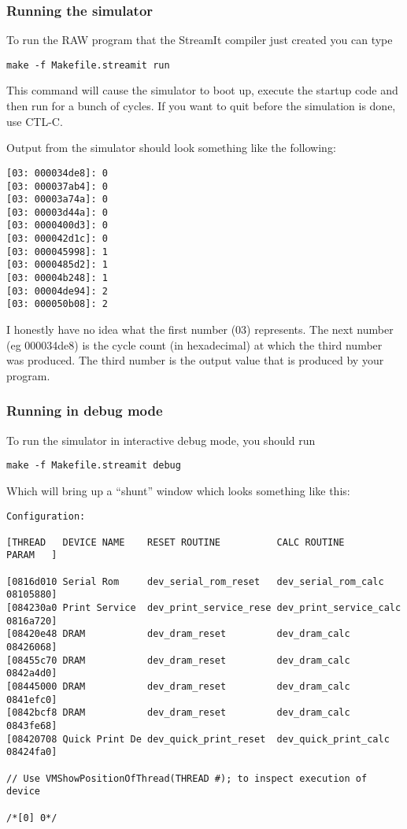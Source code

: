 \subsubsection{Running the simulator}
To run the RAW program that the StreamIt compiler just created
you can type 

\begin{verbatim}make -f Makefile.streamit run\end{verbatim}

This command will cause the simulator to boot up, execute the startup code
and then run for a bunch of cycles. If you want to quit before the 
simulation is done, use CTL-C. 

Output from the simulator should look something like the following:
\begin{verbatim}
[03: 000034de8]: 0
[03: 000037ab4]: 0
[03: 00003a74a]: 0
[03: 00003d44a]: 0
[03: 0000400d3]: 0
[03: 000042d1c]: 0
[03: 000045998]: 1
[03: 0000485d2]: 1
[03: 00004b248]: 1
[03: 00004de94]: 2
[03: 000050b08]: 2
\end{verbatim}

I honestly have no idea what the first number (03) represents. The next number 
(eg 000034de8) is the cycle count (in hexadecimal) at which the third number was produced. The 
third number is the output value that is produced by your program.

\subsubsection{Running in debug mode}
To run the simulator in interactive debug mode, you should run
\begin{verbatim}make -f Makefile.streamit debug\end{verbatim}

Which will bring up a ``shunt'' window which looks something like this:

\begin{verbatim}
Configuration: 

[THREAD   DEVICE NAME    RESET ROUTINE          CALC ROUTINE           PARAM   ]

[0816d010 Serial Rom     dev_serial_rom_reset   dev_serial_rom_calc    08105880]
[084230a0 Print Service  dev_print_service_rese dev_print_service_calc 0816a720]
[08420e48 DRAM           dev_dram_reset         dev_dram_calc          08426068]
[08455c70 DRAM           dev_dram_reset         dev_dram_calc          0842a4d0]
[08445000 DRAM           dev_dram_reset         dev_dram_calc          0841efc0]
[0842bcf8 DRAM           dev_dram_reset         dev_dram_calc          0843fe68]
[08420708 Quick Print De dev_quick_print_reset  dev_quick_print_calc   08424fa0]

// Use VMShowPositionOfThread(THREAD #); to inspect execution of device 

/*[0] 0*/ 
\end{verbatim}

